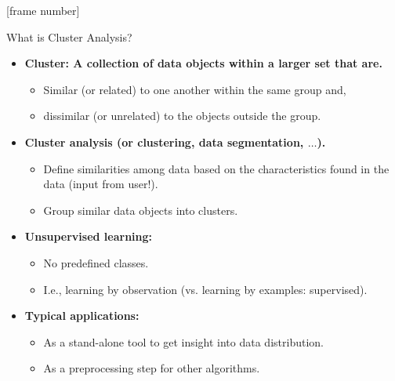 \documentclass[aspectratio=169,t,xcolor=dvipsnames]{beamer}
\begin{document}
  {
    [frame number]
    \begin{frame}{What is Cluster Analysis?}
        \begin{itemize}
          \item \textbf{{\color{airforceblue}Cluster}: A collection of data objects within a larger set that are.}
          \begin{itemize}
            \item {\color{airforceblue}Similar (or related)} to one another within the same group and,
            \item dissimilar (or unrelated) to the objects outside the group.
          \end{itemize}
          \item \textbf{{\color{airforceblue}Cluster analysis} (or clustering, data segmentation, $\ldots$).}
          \begin{itemize}
            \item {\color{airforceblue}Define similarities} among data based on the characteristics found in the data (input from user!).
            \item Group similar data objects into clusters.
          \end{itemize}
          \item \textbf{Unsupervised learning:}
          \begin{itemize}
            \item No predefined classes.
            \item I.e., learning by observation (vs. learning by examples: supervised).
          \end{itemize}
          \item \textbf{Typical applications:}
          \begin{itemize}
            \item As a stand-alone tool to get insight into data distribution.
            \item As a preprocessing step for other algorithms.
          \end{itemize}
        \end{itemize}
    \end{frame}
  }
\end{document}
